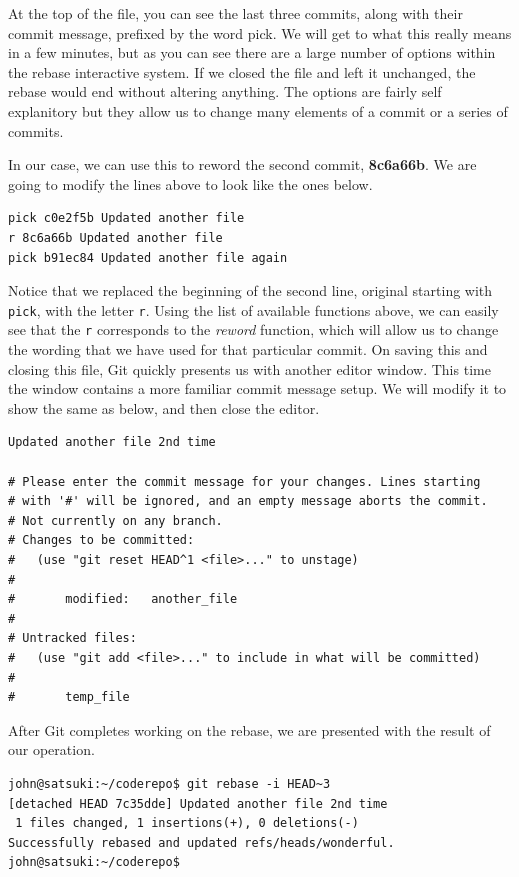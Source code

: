 At the top of the file, you can see the last three commits, along with their commit message, prefixed by the word pick.
We will get to what this really means in a few minutes, but as you can see there are a large number of options within the rebase interactive system.
If we closed the file and left it unchanged, the rebase would end without altering anything.
The options are fairly self explanitory but they allow us to change many elements of a commit or a series of commits.

In our case, we can use this to reword the second commit, \textbf{8c6a66b}.
We are going to modify the lines above to look like the ones below.

\begin{Verbatim}
pick c0e2f5b Updated another file
r 8c6a66b Updated another file
pick b91ec84 Updated another file again
\end{Verbatim}

Notice that we replaced the beginning of the second line, original starting with \texttt{pick}, with the letter \texttt{r}.
Using the list of available functions above, we can easily see that the \texttt{r} corresponds to the \emph{reword} function, which will allow us to change the wording that we have used for that particular commit.
On saving this and closing this file, Git quickly presents us with another editor window.
This time the window contains a more familiar commit message setup.
We will modify it to show the same as below, and then close the editor.

\begin{Verbatim}
Updated another file 2nd time

# Please enter the commit message for your changes. Lines starting
# with '#' will be ignored, and an empty message aborts the commit.
# Not currently on any branch.
# Changes to be committed:
#   (use "git reset HEAD^1 <file>..." to unstage)
#
#       modified:   another_file
#
# Untracked files:
#   (use "git add <file>..." to include in what will be committed)
#
#       temp_file
\end{Verbatim}

After Git completes working on the rebase, we are presented with the result of our operation.

\begin{Verbatim}
john@satsuki:~/coderepo$ git rebase -i HEAD~3
[detached HEAD 7c35dde] Updated another file 2nd time
 1 files changed, 1 insertions(+), 0 deletions(-)
Successfully rebased and updated refs/heads/wonderful.
john@satsuki:~/coderepo$
\end{Verbatim}


